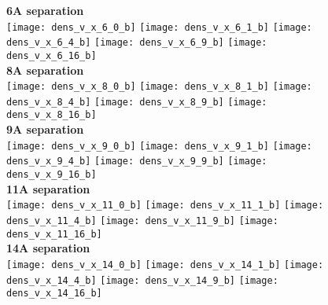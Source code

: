 \documentclass[journal=acsnano,manuscript=article]{achemso}
\begin{document}
\begin{figure}[h!]
	\centering
	\textbf{6A separation} \\
	\texttt{[image: dens\_v\_x\_6\_0\_b]} 
	\texttt{[image: dens\_v\_x\_6\_1\_b]}
	\texttt{[image: dens\_v\_x\_6\_4\_b]}
	\texttt{[image: dens\_v\_x\_6\_9\_b]}
	\texttt{[image: dens\_v\_x\_6\_16\_b]}
	 \\ \textbf{8A separation} \\
	\texttt{[image: dens\_v\_x\_8\_0\_b]} 
	\texttt{[image: dens\_v\_x\_8\_1\_b]}
	\texttt{[image: dens\_v\_x\_8\_4\_b]}
	\texttt{[image: dens\_v\_x\_8\_9\_b]}
	\texttt{[image: dens\_v\_x\_8\_16\_b]}
	 \\ \textbf{9A separation} \\
	\texttt{[image: dens\_v\_x\_9\_0\_b]} 
	\texttt{[image: dens\_v\_x\_9\_1\_b]}
	\texttt{[image: dens\_v\_x\_9\_4\_b]}
	\texttt{[image: dens\_v\_x\_9\_9\_b]}
	\texttt{[image: dens\_v\_x\_9\_16\_b]}
	 \\ \textbf{11A separation} \\
	\texttt{[image: dens\_v\_x\_11\_0\_b]} 
	\texttt{[image: dens\_v\_x\_11\_1\_b]}
	\texttt{[image: dens\_v\_x\_11\_4\_b]}
	\texttt{[image: dens\_v\_x\_11\_9\_b]}
	\texttt{[image: dens\_v\_x\_11\_16\_b]}
	 \\ \textbf{14A separation} \\
	\texttt{[image: dens\_v\_x\_14\_0\_b]} 
	\texttt{[image: dens\_v\_x\_14\_1\_b]}
	\texttt{[image: dens\_v\_x\_14\_4\_b]}
	\texttt{[image: dens\_v\_x\_14\_9\_b]}
	\texttt{[image: dens\_v\_x\_14\_16\_b]}
	\label{fig:ang}
\end{figure}
\end{document}
